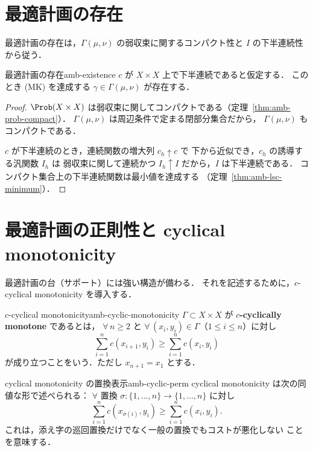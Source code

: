 \section{最適計画の存在}
\label{sec:existence}

最適計画の存在は，$\Gamma(\mu,\nu)$ の弱収束に関するコンパクト性と
$I$ の下半連続性から従う．

\begin{theorem}{最適計画の存在}{amb-existence}
  $c$ が $X \times X$ 上で下半連続であると仮定する．
  このとき (MK) を達成する $\gamma \in \Gamma(\mu,\nu)$ が存在する．
\end{theorem}

\begin{proof}
  $\Prob(X \times X)$ は弱収束に関してコンパクトである（定理~\ref{thm:amb-prob-compact}）．
  $\Gamma(\mu,\nu)$ は周辺条件で定まる閉部分集合だから，
  $\Gamma(\mu,\nu)$ もコンパクトである．

  $c$ が下半連続のとき，連続関数の増大列 $c_h \uparrow c$ で
  下から近似でき，$c_h$ の誘導する汎関数 $I_h$ は
  弱収束に関して連続かつ $I_h \uparrow I$ だから，$I$ は下半連続である．
  コンパクト集合上の下半連続関数は最小値を達成する
  （定理~\ref{thm:amb-lsc-minimum}）．
\end{proof}

\section{最適計画の正則性と cyclical monotonicity}
\label{sec:regularity}

最適計画の台（サポート）には強い構造が備わる．
それを記述するために，$c$-cyclical monotonicity を導入する．

\begin{definition}{$c$-cyclical monotonicity}{amb-cyclic-monotonicity}
  $\Gamma \subset X \times X$ が \textbf{$c$-cyclically monotone} であるとは，
  $\forall\, n \geq 2$ と $\forall\, (x_i, y_i) \in \Gamma$（$1 \leq i \leq n$）に対し
  \[
    \sum_{i=1}^{n} c(x_{i+1}, y_i) \geq \sum_{i=1}^{n} c(x_i, y_i)
  \]
  が成り立つことをいう．ただし $x_{n+1} = x_1$ とする．
\end{definition}

\begin{remark}{cyclical monotonicity の置換表示}{amb-cyclic-perm}
  cyclical monotonicity は次の同値な形で述べられる：
  $\forall$ 置換 $\sigma \colon \{1,\ldots,n\} \to \{1,\ldots,n\}$ に対し
  \[
    \sum_{i=1}^{n} c(x_{\sigma(i)}, y_i) \geq \sum_{i=1}^{n} c(x_i, y_i).
  \]
  これは，添え字の巡回置換だけでなく一般の置換でもコストが悪化しない
  ことを意味する．
\end{remark}

